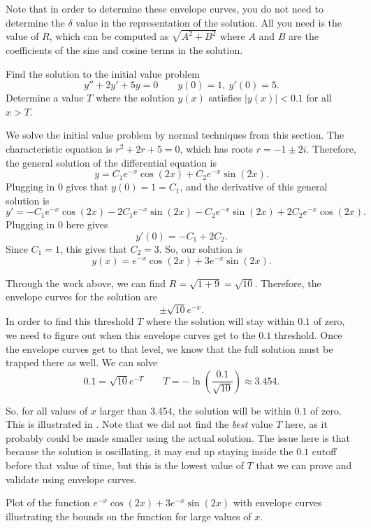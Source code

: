 \documentclass{ximera}
\begin{document}
Note that in order to determine these envelope curves, you do not need to determine the $\delta$ value in the representation of the solution. All you need is the value of $R$, which can be computed as $\sqrt{A^2 + B^2}$ where $A$ and $B$ are the coefficients of the sine and cosine terms in the solution. 

\begin{example}
    Find the solution to the initial value problem
    \[ 
        y'' + 2y' + 5y = 0 \qquad y(0) = 1,\ y'(0) = 5. 
    \]
    Determine a value $T$ where the solution $y(x)$ satisfies $|y(x)| < 0.1$ for all $x > T$. 
\end{example}

\begin{exampleSol}
    We solve the initial value problem by normal techniques from this section. The characteristic equation is $r^2 + 2r + 5 = 0$, which has roots $r = -1 \pm 2i$. Therefore, the general solution of the differential equation is
    \[ 
        y = C_1e^{-x}\cos(2x) + C_2 e^{-x}\sin(2x). 
    \]
    Plugging in $0$ gives that $y(0) = 1 = C_1$, and the derivative of this general solution is
    \[ 
        y' = -C_1e^{-x}\cos(2x) -2C_1e^{-x}\sin(2x) - C_2e^{-x}\sin(2x) + 2C_2e^{-x}\cos(2x). 
    \] 
    Plugging in $0$ here gives
    \[
        y'(0) = -C_1 + 2C_2. 
    \] 
    Since $C_1 = 1$, this gives that $C_2 = 3$. So, our solution is
    \[ 
        y(x) = e^{-x}\cos(2x) + 3e^{-x}\sin(2x). 
    \]
    
    Through the work above, we can find $R = \sqrt{1 + 9} = \sqrt{10}$. Therefore, the envelope curves for the solution are
    \[ 
        \pm \sqrt{10}e^{-x}. 
    \] 
    In order to find this threshold $T$ where the solution will stay within $0.1$ of zero, we need to figure out when this envelope curves get to the $0.1$ threshold. Once the envelope curves get to that level, we know that the full solution must be trapped there as well. We can solve
    \[ 
        0.1 = \sqrt{10}e^{-T} \qquad T = - \ln\left(\frac{0.1}{\sqrt{10}}\right) \approx 3.454. 
    \]
    
    So, for all values of $x$ larger than 3.454, the solution will be within $0.1$ of zero. This is illustrated in . Note that we did not find the \emph{best} value $T$ here, as it probably could be made smaller using the actual solution. The issue here is that because the solution is oscillating, it may end up staying inside the $0.1$ cutoff before that value of time, but this is the lowest value of $T$ that we can prove and validate using envelope curves.
\end{exampleSol}

\begin{myfig}
    \capstart
    \caption{Plot of the function $e^{-x}\cos(2x) + 3e^{-x}\sin(2x)$ with envelope curves illustrating the bounds on the function for large values of $x$. \label{envBounds:fig}}
\end{myfig}
\end{document}
